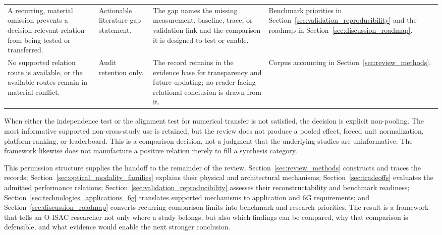 \begin{table}[!t]
\begin{tabularx}{\textwidth}{@{}>{\raggedright\arraybackslash}p{}
>{\raggedright\arraybackslash}p{}
>{\raggedright\arraybackslash}p{}
>{\raggedright\arraybackslash}X@{}}
A recurring, material omission prevents a decision-relevant relation from
being tested or transferred. &
Actionable literature-gap statement. &
The gap names the missing measurement, baseline, trace, or validation link and
the comparison it is designed to test or enable. &
Benchmark priorities in Section~\ref{sec:validation_reproducibility} and the
roadmap in Section~\ref{sec:discussion_roadmap}. \\

No supported relation route is available, or the available routes remain in
material conflict. &
Audit retention only. &
The record remains in the evidence base for transparency and future updating;
no reader-facing relational conclusion is drawn from it. &
Corpus accounting in Section~\ref{sec:review_methods}. \\
\bottomrule
\end{tabularx}
\end{table}

When either the independence test or the alignment test for numerical transfer
is not satisfied, the decision is explicit non-pooling. The most informative
supported non-cross-study use is retained, but the review does not produce a
pooled effect, forced unit normalization, platform ranking, or leaderboard.
This is a comparison decision, not a judgment that the underlying studies are
uninformative. The framework likewise does not manufacture a positive relation
merely to fill a synthesis category.

This permission structure supplies the handoff to the remainder of the review.
Section~\ref{sec:review_methods} constructs and traces the records;
Section~\ref{sec:optical_modality_families} explains their physical and
architectural mechanisms; Section~\ref{sec:tradeoffs} evaluates the admitted
performance relations; Section~\ref{sec:validation_reproducibility} assesses
their reconstructability and benchmark readiness;
Section~\ref{sec:technologies_applications_6g} translates supported mechanisms
to application and 6G requirements; and Section~\ref{sec:discussion_roadmap}
converts recurring comparison limits into
benchmark and research priorities. The result is a framework that tells an
O-ISAC researcher not only where a study belongs, but also which findings can
be compared, why that comparison is defensible, and what evidence would enable
the next stronger conclusion.

\FloatBarrier
